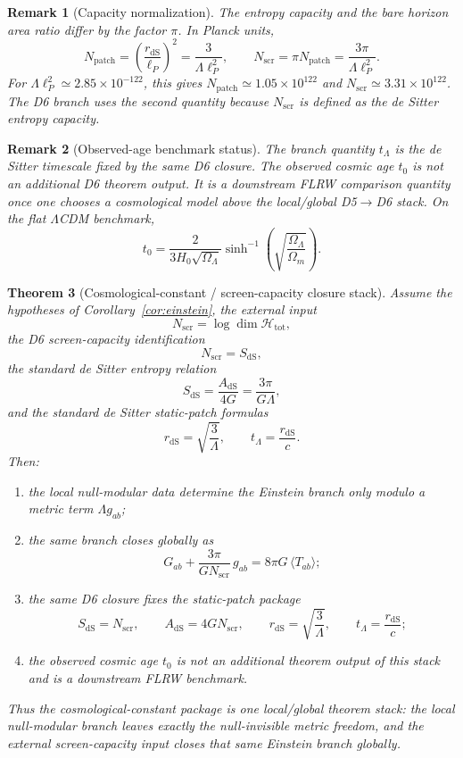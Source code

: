 \documentclass[11pt]{article}
\newtheorem{theorem}{Theorem}[section]
\newtheorem{remark}[theorem]{Remark}
\begin{document}
\begin{remark}[Capacity normalization]\label{rem:lambda-capacity-normalization}
The entropy capacity and the bare horizon area ratio differ by the factor \(\pi\). In Planck units,
\[
N_{\mathrm{patch}}=\left(\frac{r_{\mathrm{dS}}}{\ell_P}\right)^2
=\frac{3}{\Lambda\ell_P^2},
\qquad
N_{\mathrm{scr}}=\pi N_{\mathrm{patch}}
=\frac{3\pi}{\Lambda\ell_P^2}.
\]
For \(\Lambda\ell_P^2\simeq2.85\times10^{-122}\), this gives
\(N_{\mathrm{patch}}\simeq1.05\times10^{122}\) and
\(N_{\mathrm{scr}}\simeq3.31\times10^{122}\). The D6 branch uses the second quantity because
\(N_{\mathrm{scr}}\) is defined as the de Sitter entropy capacity.
\end{remark}

\begin{remark}[Observed-age benchmark status]\label{rem:lambda-age}
The branch quantity \(t_\Lambda\) is the de Sitter timescale fixed by the same D6 closure. The observed cosmic age \(t_0\) is not an additional D6 theorem output. It is a downstream FLRW comparison quantity once one chooses a cosmological model above the local/global D5\(\to\)D6 stack. On the flat \(\Lambda\)CDM benchmark,
\[
t_0=\frac{2}{3H_0\sqrt{\Omega_\Lambda}}
\sinh^{-1}\!\left(\sqrt{\frac{\Omega_\Lambda}{\Omega_m}}\right).
\]
\end{remark}

\begin{theorem}[Cosmological-constant / screen-capacity closure stack]\label{thm:lambda-stack}
Assume the hypotheses of Corollary~\ref{cor:einstein}, the external input
\[
N_{\mathrm{scr}}=\log \dim \mathcal H_{\mathrm{tot}},
\]
the D6 screen-capacity identification
\[
N_{\mathrm{scr}}=S_{\mathrm{dS}},
\]
\noindent the standard de Sitter entropy relation
\[
S_{\mathrm{dS}}=\frac{A_{\mathrm{dS}}}{4G}=\frac{3\pi}{G\Lambda},
\]
and the standard de Sitter static-patch formulas
\[
r_{\mathrm{dS}}=\sqrt{\frac{3}{\Lambda}},
\qquad
t_\Lambda=\frac{r_{\mathrm{dS}}}{c}.
\]
Then:
\begin{enumerate}[label=\textup{(\roman*)},leftmargin=2em]
\item the local null-modular data determine the Einstein branch only modulo a metric term \(\Lambda g_{ab}\);
\item the same branch closes globally as
\[
G_{ab}+\frac{3\pi}{G N_{\mathrm{scr}}}\,g_{ab}=8\pi G\,\langle T_{ab}\rangle;
\]
\item the same D6 closure fixes the static-patch package
\[
S_{\mathrm{dS}}=N_{\mathrm{scr}},
\qquad
A_{\mathrm{dS}}=4G N_{\mathrm{scr}},
\qquad
r_{\mathrm{dS}}=\sqrt{\frac{3}{\Lambda}},
\qquad
t_\Lambda=\frac{r_{\mathrm{dS}}}{c};
\]
\item the observed cosmic age \(t_0\) is not an additional theorem output of this stack and is a downstream FLRW benchmark.
\end{enumerate}
Thus the cosmological-constant package is one local/global theorem stack: the local null-modular branch leaves exactly the null-invisible metric freedom, and the external screen-capacity input closes that same Einstein branch globally.
\end{theorem}
\end{document}
